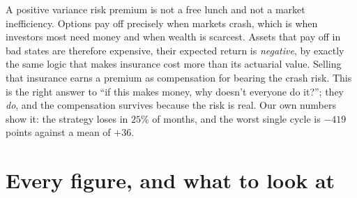 \documentclass[11pt,a4paper]{article}
\begin{document}
\begin{whybox}
A positive variance risk premium is not a free lunch and not a market inefficiency. Options pay
off precisely when markets crash, which is when investors most need money and when wealth is
scarcest. Assets that pay off in bad states are therefore expensive, their expected return
is \emph{negative}, by exactly the same logic that makes insurance cost more than its actuarial
value. Selling that insurance earns a premium as compensation for bearing the crash risk.
\smallskip
This is the right answer to ``if this makes money, why doesn't everyone do it?''; they
\emph{do}, and the compensation survives because the risk is real. Our own numbers show it:
the strategy loses in $25\%$ of months, and the worst single cycle is $-419$ points against a
mean of $+36$.
\end{whybox}

\section{Every figure, and what to look at}
\end{document}
